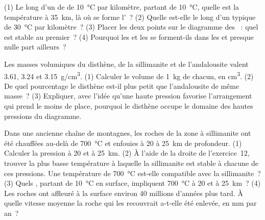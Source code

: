\begin{exercise}[$\star\star\star$]\label{exo:g12:metamorphic-rocks:13}
(1) Le long d'un  de  de \qty{10}{\celsius} par
kilomètre, partant de \qty{10}{\celsius}, quelle est la température à
\qty{35}{km}, là où se forme l'~? (2) Quelle est-elle le long d'un
 typique de \qty{30}{\celsius} par kilomètre~? (3) Placer les deux
points sur le diagramme des ~: quel  est stable au
premier~? (4) Pourquoi les  et les  se forment-ils
dans les  et presque nulle part ailleurs~?
\end{exercise}

\begin{exercise}[$\star\star\star$]\label{exo:g12:metamorphic-rocks:14}
Les masses volumiques du disthène, de la sillimanite et de l'andalousite
valent \num{3.61}, \num{3.24} et \qty{3.15}{g/cm^3}. (1) Calculer le volume
de \qty{1}{kg} de chacun, en \unit{cm^3}. (2) De quel pourcentage le
disthène est-il plus petit que l'andalousite de même masse~? (3) Expliquer,
avec l'idée qu'une haute pression favorise l'arrangement qui prend le moins
de place, pourquoi le disthène occupe le domaine des hautes pressions du
diagramme.
\end{exercise}

\begin{exercise}[$\star\star\star$]\label{exo:g12:metamorphic-rocks:15}
Dans une ancienne chaîne de montagnes, les roches de la zone à sillimanite
ont été chauffées au-delà de \qty{700}{\celsius} et enfouies à 20 à
\qty{25}{km} de profondeur. (1) Calculer la pression à 20 et à
\qty{25}{km}. (2) À l'aide de la droite de l'exercice~12, trouver la plus
basse température à laquelle la sillimanite est stable à chacune de ces
pressions. Une température de \qty{700}{\celsius} est-elle compatible avec
la sillimanite~? (3) Quels , partant de
\qty{10}{\celsius} en surface, impliquent \qty{700}{\celsius} à 20 et à
\qty{25}{km}~? (4) Les roches ont affleuré à la surface environ 40 millions
d'années plus tard. À quelle vitesse moyenne la roche qui les recouvrait
a-t-elle été enlevée, en \unit{mm} par an~?
\end{exercise}

